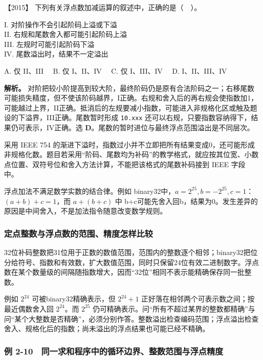 \noindent{}【2015】 下列有关浮点数加减运算的叙述中，正确的是（　）。

I. 对阶操作不会引起阶码上溢或下溢\\
II. 右规和尾数舍入都可能引起阶码上溢\\
III. 左规时可能引起阶码下溢\\
IV. 尾数溢出时，结果不一定溢出

A. 仅 II、III　 B. 仅 I、II、IV　 C. 仅 I、III、IV　 D. I、II、III、IV


\textbf{解析。} 对阶把较小阶提高到较大阶，最终阶码仍是原有合法阶码之一；右移尾数可能损失精度，但不使该阶码越界，I正确。右规和舍入后的再右规会使指数加1，可能越过上界，II正确。抵消后的左规要减小指数，可能进入非规格化区或触及题设的下溢界，III正确。尾数暂时形成 \texttt{10.xxx} 还可以右规，只要指数容纳得下，结果仍可表示，IV正确。选 \textbf{D}。尾数的暂时进位与最终浮点范围溢出是不同层次。

采用 IEEE 754 的渐进下溢时，指数过小并不立即把所有结果变成0，还可能形成非规格化数。题目若采用``阶码、尾数均为补码''的教学格式，就应按其位宽、小数点位置、双符号位和舍入方法计算，不能把该格式的尾数补码接到 IEEE 字段中。

浮点加法不满足数学实数的结合律。例如 binary32中，\(a=2^{25},b=-2^{25},c=1\)：\((a+b)+c=1\)，而 \(a+(b+c)\) 中 b+c可能先舍入回b，结果为0。发生差异的原因是中间舍入，不是加法指令随意改变数学规则。

\subsubsection{定点整数与浮点数的范围、精度怎样比较}\label{ux5b9aux70b9ux6574ux6570ux4e0eux6d6eux70b9ux6570ux7684ux8303ux56f4ux7cbeux5ea6ux600eux6837ux6bd4ux8f83}

32位补码整数把31位用于正数的数值范围，范围内的整数逐个相邻；binary32把位分给符号、指数和有效数，扩大数值范围，同时只保留24位有效二进制数字。浮点数在某个数量级的间隔随指数增大，因而``32位''相同不表示能精确保存同一批整数。

例如 \(2^{24}\) 可被binary32精确表示，但 \(2^{24}+1\) 正好落在相邻两个可表示数之间；按最近偶数舍入回 \(2^{24}\)。而 \(2^{25}\) 仍可精确表示。问``所有不超过某界的整数都精确''与问``某个大整数是否精确''，必须分别作答。整数溢出检查编码范围；浮点溢出检查舍入、规格化后的指数；尚未溢出的浮点结果也可能已经不精确。

\subsubsection{例 2-10　同一求和程序中的循环边界、整数范围与浮点精度}\label{co-ex2-10}

